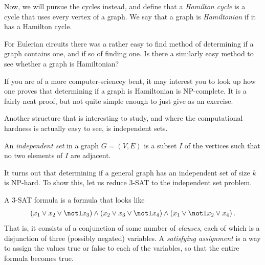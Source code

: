 \documentclass[nobib]{tufte-handout}
\begin{document}
Now, we will pursue the cycles instead, and define that a \emph{Hamilton cycle} is a cycle that uses every vertex of a graph. We say that a graph is \emph{Hamiltonian} if it has a Hamilton cycle.

\begin{xca}
  For Eulerian circuits there was a rather easy to find method of determining if a graph contains one, and if so of finding one. Is there a similarly easy method to see whether a graph is Hamiltonian?
\end{xca}

If you are of a more computer-sciencey bent, it may interest you to look up how one proves that determining if a graph is Hamiltonian is NP-complete. It is a fairly neat proof, but not quite simple enough to just give as an exercise.

Another structure that is interesting to study, and where the computational hardness is actually easy to see, is independent sets.

\begin{definition}
  An \emph{independent set} in a graph $G = (V,E)$ is a subset $I$ of the vertices such that no two elements of $I$ are adjacent.
\end{definition}

It turns out that determining if a general graph has an independent set of size $k$ is NP-hard. To show this, let us reduce $3$-SAT to the independent set problem.

\begin{definition}
  A $3$-SAT formula is a formula that looks like
  $$\left(x_1 \vee x_2 \vee \notl x_3\right) \wedge \left(x_2 \vee x_3 \vee \notl x_4\right) \wedge \left(x_1 \vee \notl x_2 \vee x_4\right).$$
  That is, it consists of a conjunction of some number of \emph{clauses}, each of which is a disjunction of three (possibly negated) variables. A \emph{satisfying assignment} is a way to assign the values true or false to each of the variables, so that the entire formula becomes true.
\end{definition}
\end{document}
